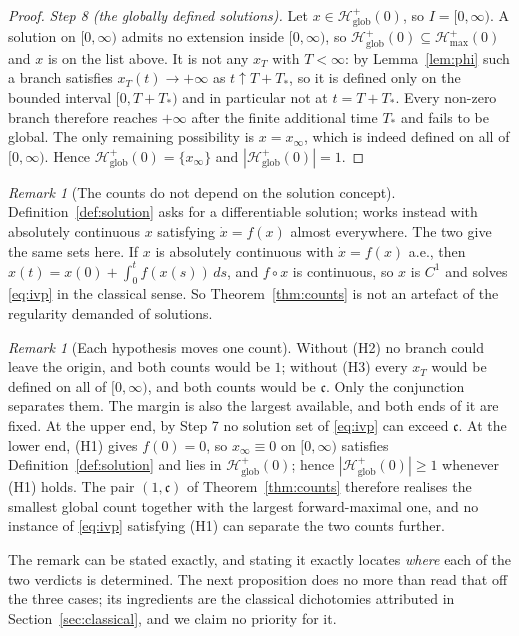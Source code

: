 \documentclass[12pt]{article}
\theoremstyle{plain}
\theoremstyle{definition}
\theoremstyle{remark}
\newtheorem{remark}[theorem]{Remark}
\newcommand{\cont}{\mathfrak{c}}
\newcommand{\Hglob}{\mathcal{H}^{+}_{\mathrm{glob}}}
\newcommand{\Hmax}{\mathcal{H}^{+}_{\max}}
\begin{document}
\begin{proof}
\smallskip
\emph{Step 8 (the globally defined solutions).} Let $x\in\Hglob(0)$, so
$I=[0,\infty)$. A solution on $[0,\infty)$ admits no extension inside
$[0,\infty)$, so $\Hglob(0)\subseteq\Hmax(0)$ and $x$ is on the list above. It
is not any $x_{T}$ with $T<\infty$: by Lemma~\ref{lem:phi} such a branch
satisfies $x_{T}(t)\to+\infty$ as $t\uparrow T+T_{*}$, so it is defined only on
the bounded interval $[0,T+T_{*})$ and in particular not at $t=T+T_{*}$. Every
non-zero branch therefore reaches $+\infty$ after the finite additional time
$T_{*}$ and fails to be global. The only remaining possibility is
$x=x_{\infty}$, which is indeed defined on all of $[0,\infty)$. Hence
$\Hglob(0)=\{x_{\infty}\}$ and $|\Hglob(0)|=1$.
\end{proof}

\begin{remark}[The counts do not depend on the solution concept]\label{rem:AC}
Definition~\ref{def:solution} asks for a differentiable solution; \citet{Binding} works instead with absolutely continuous $x$ satisfying
$\dot x=f(x)$ almost everywhere. The two give the same sets here. If $x$ is
absolutely continuous with $\dot x=f(x)$ a.e., then
$x(t)=x(0)+\int_{0}^{t}f(x(s))\,ds$, and $f\circ x$ is continuous, so $x$ is
$C^{1}$ and solves \eqref{eq:ivp} in the classical sense. So
Theorem~\ref{thm:counts} is not an artefact of the regularity demanded of
solutions.
\end{remark}

\begin{remark}[Each hypothesis moves one count]\label{rem:sensitivity}
Without (H2) no branch could leave the origin, and both counts would be $1$;
without (H3) every $x_{T}$ would be defined on all of $[0,\infty)$, and both
counts would be $\cont$. Only the conjunction separates them. The margin is also
the largest available, and both ends of it are fixed. At the upper end, by
Step 7 no solution set of \eqref{eq:ivp} can exceed $\cont$. At the lower end,
(H1) gives $f(0)=0$, so $x_{\infty}\equiv0$ on $[0,\infty)$ satisfies
Definition~\ref{def:solution} and lies in $\Hglob(0)$; hence
$|\Hglob(0)|\ge1$ whenever (H1) holds. The pair $(1,\cont)$ of
Theorem~\ref{thm:counts} therefore realises the smallest global count together
with the largest forward-maximal one, and no instance of \eqref{eq:ivp}
satisfying (H1) can separate the two counts further.
\end{remark}

The remark can be stated exactly, and stating it exactly locates \emph{where}
each of the two verdicts is determined. The next proposition does no more than
read that off the three cases; its ingredients are the classical dichotomies
attributed in Section~\ref{sec:classical}, and we claim no priority for it.
\end{document}
